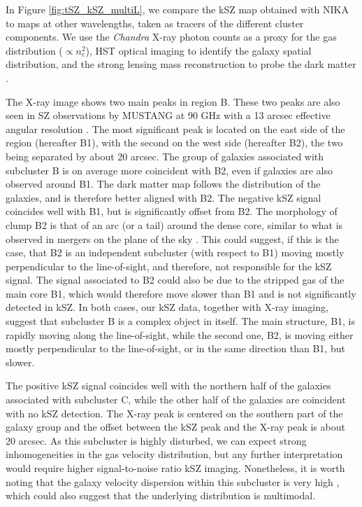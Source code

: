 \documentclass[twocolumn,traditabstract]{aa}
\begin{document}
In Figure \ref{fig:tSZ_kSZ_multiL}, we compare the kSZ map obtained with NIKA to maps at other wavelengths, taken as tracers of the different cluster components. We use the \textit{Chandra} X-ray photon counts as a proxy for the gas distribution ($\propto n_e^2$), HST optical imaging \citep[CLASH data,][]{Postman2012} to identify the galaxy spatial distribution, and the strong lensing mass reconstruction to probe the dark matter \citep{Zitrin2011}. 

The X-ray image shows two main peaks in region B. These two peaks are also seen in SZ observations by MUSTANG at 90 GHz with a 13 arcsec effective angular resolution \citep{Mroczkowski2012}. The most significant peak is located on the east side of the region (hereafter B1), with the second on the west side (hereafter B2), the two being separated by about 20 arcsec. The group of galaxies associated with subcluster B is on average more coincident with B2, even if galaxies are also observed around B1. The dark matter map follows the distribution of the galaxies, and is therefore better aligned with B2. The negative kSZ signal coincides well with B1, but is significantly offset from B2. The morphology of clump B2 is that of an arc (or a tail) around the dense core, similar to what is observed in mergers on the plane of the sky \citep[e.g.,][for the bullet cluster]{Clowe2006}. This could suggest, if this is the case, that B2 is an independent subcluster (with respect to B1) moving mostly perpendicular to the line-of-sight, and therefore, not responsible for the kSZ signal. The signal associated to B2 could also be due to the stripped gas of the main core B1, which would therefore move slower than B1 and is not significantly detected in kSZ. In both cases, our kSZ data, together with X-ray imaging, suggest that subcluster B is a complex object in itself. The main structure, B1, is rapidly moving along the line-of-sight, while the second one, B2, is moving either mostly perpendicular to the line-of-sight, or in the same direction than B1, but slower.

The positive kSZ signal coincides well with the northern half of the galaxies associated with subcluster C, while the other half of the galaxies are coincident with no kSZ detection. The X-ray peak is centered on the southern part of the galaxy group and the offset between the kSZ peak and the X-ray peak is about 20 arcsec. As this subcluster is highly disturbed, we can expect strong inhomogeneities in the gas velocity distribution, but any further interpretation would require higher signal-to-noise ratio kSZ imaging. Nonetheless, it is worth noting that the galaxy velocity dispersion within this subcluster is very high \citep[$1761^{+234}_{-607}$ km/s for 10 redshifts, see][]{Ma2009}, which could also suggest that the underlying distribution is multimodal.
\end{document}

